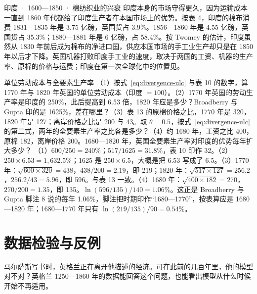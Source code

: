 \begin{case}{印度 · 1600—1850 · 棉纺织业的兴衰}
印度本身的市场守得更久，因为运输成本一直到 1860 年代都给了印度生产者在本国市场上的优势\cite{bg2005}。按表 4，印度的棉布消费 1831—1835 年是 3.75 亿磅，英国货占 3.9\%。1856—1860 年是 4.55 亿磅，英国货占 35.3\%；1880—1881 年是 6 亿磅，占 58.4\%\cite{bg2005}。按 Twomey 的估计，印度虽然从 1830 年前后成为棉布的净进口国，供应本国市场的手工业生产却只是在 1850 年以后才下降\cite{bg2005}。英国机器打败印度手工业的速度，取决于两国的工资、机器的生产率、原棉的价格与运费；印度在第一次全球化中的位置见。
\end{case}

\begin{example}{单位劳动成本与全要素生产率}\label{ex:divergence-ulc}
（1）按式~\eqref{eq:divergence-ulc} 与表 10 的数字，算 1770 年与 1820 年英国的单位劳动成本（印度 $=100$）。（2）1770 年英国的劳动生产率是印度的 250\%，此后提高到 6.53 倍，1820 年应是多少？Broadberry 与 Gupta 印的是 1625\%，差在哪里？（3）表 13 的原棉价格之比，1770 年是 320，1820 年是 127；离岸价格之比是 200 与 43。取 $\theta=0.5$，按式~\eqref{eq:divergence-ulc} 的第二式，两年的全要素生产率之比各是多少？（4）约 1680 年，工资之比 400，原棉 182，离岸价格 200。1680—1820 年，英国全要素生产率对印度的优势每年扩大多少？
\solution （1）$600/250=240\%$；$517/1625=31.8\%$，表 10 印作 32。（2）$250\times6.53=1{,}632.5\%$；1625 是 $250\times6.5$，大概是把 6.53 写成了 6.5。（3）1770 年：$\sqrt{600\times320}=438$，$438/200=2.19$，即 219；1820 年：$\sqrt{517\times127}=256.2$，$256.2/43=5.96$，即 596。与表 13 一致。（4）1680 年：$\sqrt{400\times182}=270$，$270/200=1.35$，即 135。$\ln(596/135)/140=1.06\%$。这正是 Broadberry 与 Gupta 脚注 8 说的每年 1.06\%，脚注把时期印作“1680—1770”，按表算应是 1680—1820 年；1680—1770 年只有 $\ln(219/135)/90=0.54\%$。
\end{example}


\section{数据检验与反例}\label{sec:divergence-test}

马尔萨斯写书时，英格兰正在离开他描述的经济。可在此前的几百年里，他的模型对不对？英格兰 1250—1860 年的数据能回答这个问题，也能看出模型从什么时候开始不再适用。

